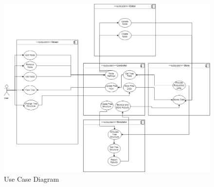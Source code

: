 \documentclass[12pt]{article}
\begin{document}
  \begin{figure}[H]
    \includegraphics[width=\linewidth]{TriiUseCaseDiagram}
    \caption{Use Case Diagram}
    \label{fig:usecasediagram}
  \end{figure}
\end{document}
